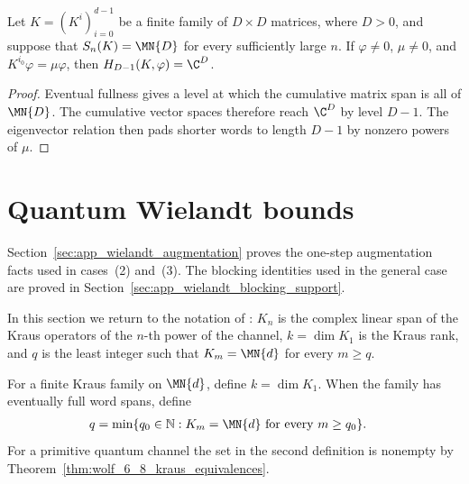 \begin{theorem}
    \label{thm:eigenvector_spreading_eventually_full}
    \leanok
    Let $K=(K^i)_{i=0}^{d-1}$ be a finite family of $D\times D$ matrices, where
    $D>0$, and suppose that $S_n(K)=\MN{D}$ for every sufficiently large
    $n$. If $\varphi\neq0$, $\mu\neq0$, and
    $K^{i_0}\varphi=\mu\varphi$, then
    $H_{D-1}(K,\varphi)=\C^D$.
\end{theorem}

\begin{proof}\leanok
    Eventual fullness gives a level at which the cumulative matrix span is
    all of $\MN{D}$. The cumulative vector spaces therefore reach $\C^D$ by
    level $D-1$. The eigenvector relation then pads shorter words to length
    $D-1$ by nonzero powers of $\mu$.
\end{proof}

\section{Quantum Wielandt bounds}

Section~\ref{sec:app_wielandt_augmentation} proves the one-step augmentation
facts used in cases~(2) and~(3). The blocking identities used in the general
case are proved in Section~\ref{sec:app_wielandt_blocking_support}.

In this section we return to the notation of
\cite[Theorem~6.9]{Wolf2012Quantum}: $K_n$ is the complex linear span of the
Kraus operators of the $n$-th power of the channel, $k=\dim K_1$ is the Kraus
rank, and $q$ is the least integer such that $K_m=\MN{d}$ for every $m\geq q$.

\begin{definition}
    \label{def:wolf_kraus_rank_wielandt_index}
    \leanok
    For a finite Kraus family on $\MN{d}$, define $k=\dim K_1$. When the
    family has eventually full word spans, define
    \begin{align}
        q&=\min\{q_0\in\mathbb N:K_m=\MN{d}\text{ for every }m\geq q_0\}.
        \notag
    \end{align}
    For a primitive quantum channel the set in the second definition is
    nonempty by Theorem~\ref{thm:wolf_6_8_kraus_equivalences}.
\end{definition}


